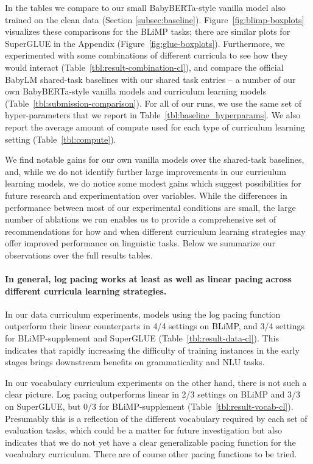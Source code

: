 In the tables we compare to our small BabyBERTa-style vanilla model also trained on the clean data (Section \ref{subsec:baseline}). Figure~\ref{fig:blimp-boxplots} visualizes these comparisons for the BLiMP tasks; there are  similar plots for SuperGLUE in the Appendix (Figure~\ref{fig:glue-boxplots}).
Furthermore, we experimented with some combinations of different curricula to see how they would interact (Table~\ref{tbl:result-combination-cl}), and compare the official BabyLM shared-task baselines with our shared task entries -- a number of our own BabyBERTa-style vanilla models and curriculum learning models (Table~\ref{tbl:submission-comparison}). For all of our runs, we use the same set of hyper-parameters that we report in Table~\ref{tbl:baseline_hyperparams}. We also report the average amount of compute used for each type of curriculum learning setting (Table~\ref{tbl:compute}).

 
We find notable gains for our own vanilla models over the shared-task baselines, and, while we do not identify further large improvements in our curriculum learning models, we do notice some modest gains which suggest possibilities for future research and experimentation over variables. While the differences in performance between most of our experimental conditions are small, the large number of ablations we run enables us to provide a comprehensive set of recommendations for how and when different curriculum learning strategies may offer improved performance on linguistic tasks.
Below we summarize our observations over the full results tables.


\paragraph{In general, log pacing works at least as well as linear pacing across different curricula learning strategies.}
In our data curriculum experiments, models using the log pacing function outperform their linear counterparts in 4/4 settings on BLiMP, and 3/4 settings for BLiMP-supplement and SuperGLUE (Table~\ref{tbl:result-data-cl}). This indicates that rapidly increasing the difficulty of training instances in the early stages brings downstream benefits on grammaticality and NLU tasks.

In our vocabulary curriculum experiments on the other hand, there is not such a clear picture. Log pacing outperforms linear in 2/3 settings on BLiMP and 3/3 on SuperGLUE, but 0/3 for BLiMP-supplement (Table~\ref{tbl:result-vocab-cl}).
Presumably this is a reflection of the different vocabulary required by each set of evaluation tasks, which could be a matter for future investigation but also indicates that we do not yet have a clear generalizable pacing function for the vocabulary curriculum. There are of course other pacing functions to be tried.

